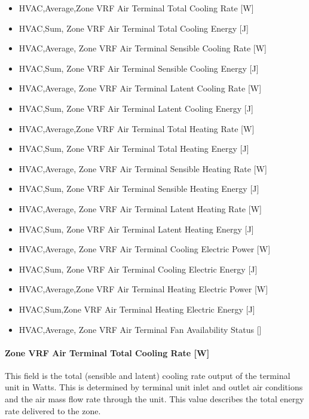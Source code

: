\begin{itemize}
\item
  HVAC,Average,Zone VRF Air Terminal Total Cooling Rate {[}W{]}
\item
  HVAC,Sum, Zone VRF Air Terminal Total Cooling Energy {[}J{]}
\item
  HVAC,Average, Zone VRF Air Terminal Sensible Cooling Rate {[}W{]}
\item
  HVAC,Sum, Zone VRF Air Terminal Sensible Cooling Energy {[}J{]}
\item
  HVAC,Average, Zone VRF Air Terminal Latent Cooling Rate {[}W{]}
\item
  HVAC,Sum, Zone VRF Air Terminal Latent Cooling Energy {[}J{]}
\item
  HVAC,Average,Zone VRF Air Terminal Total Heating Rate {[}W{]}
\item
  HVAC,Sum, Zone VRF Air Terminal Total Heating Energy {[}J{]}
\item
  HVAC,Average, Zone VRF Air Terminal Sensible Heating Rate {[}W{]}
\item
  HVAC,Sum, Zone VRF Air Terminal Sensible Heating Energy {[}J{]}
\item
  HVAC,Average, Zone VRF Air Terminal Latent Heating Rate {[}W{]}
\item
  HVAC,Sum, Zone VRF Air Terminal Latent Heating Energy {[}J{]}
\item
  HVAC,Average, Zone VRF Air Terminal Cooling Electric Power {[}W{]}
\item
  HVAC,Sum, Zone VRF Air Terminal Cooling Electric Energy {[}J{]}
\item
  HVAC,Average,Zone VRF Air Terminal Heating Electric Power {[}W{]}
\item
  HVAC,Sum,Zone VRF Air Terminal Heating Electric Energy {[}J{]}
\item
  HVAC,Average, Zone VRF Air Terminal Fan Availability Status {[]}
\end{itemize}

\paragraph{Zone VRF Air Terminal Total Cooling Rate {[}W{]}}\label{zone-vrf-air-terminal-total-cooling-rate-w}

This field is the total (sensible and latent) cooling rate output of the terminal unit in Watts. This is determined by terminal unit inlet and outlet air conditions and the air mass flow rate through the unit. This value describes the total energy rate delivered to the zone.

